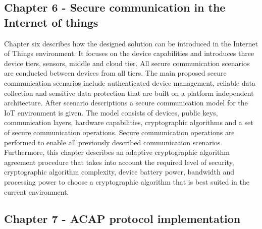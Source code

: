 
\subsection*{Chapter 6 - Secure communication in the Internet of things}

Chapter six describes how the designed solution can be introduced in the
Internet of Things environment. It focuses on the device capabilities and
introduces three device tiers, sensors, middle and cloud tier. All secure
communication scenarios are conducted between devices from all tiers. The main
proposed secure communication scenarios include authenticated device management,
reliable data collection and sensitive data protection that are built on a
platform independent architecture. After scenario descriptions a secure
communication model for the IoT environment is given. The model consists of
devices, public keys, communication layers, hardware capabilities, cryptographic
algorithms and a set of secure communication operations. Secure communication
operations are performed to enable all previously described communication
scenarios. Furthermore, this chapter describes an adaptive cryptographic
algorithm agreement procedure that takes into account the required level of
security, cryptographic algorithm complexity, device battery power, bandwidth
and processing power to choose a cryptographic algorithm that is best suited in
the current environment.

\subsection*{Chapter 7 - ACAP protocol implementation}

